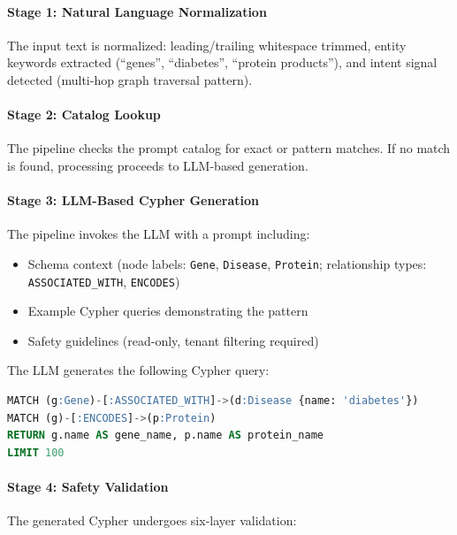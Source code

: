 \documentclass[a4paper,twoside]{sapthesis}
\begin{document}
\paragraph{Stage 1: Natural Language Normalization}
The input text is normalized: leading/trailing whitespace trimmed, entity keywords extracted (``genes'', ``diabetes'', ``protein products''), and intent signal detected (multi-hop graph traversal pattern).

\paragraph{Stage 2: Catalog Lookup}
The pipeline checks the prompt catalog for exact or pattern matches. If no match is found, processing proceeds to LLM-based generation.

\paragraph{Stage 3: LLM-Based Cypher Generation}
The pipeline invokes the LLM with a prompt including:
\begin{itemize}
    \item Schema context (node labels: \texttt{Gene}, \texttt{Disease}, \texttt{Protein}; relationship types: \texttt{ASSOCIATED\_WITH}, \texttt{ENCODES})
    \item Example Cypher queries demonstrating the pattern
    \item Safety guidelines (read-only, tenant filtering required)
\end{itemize}

The LLM generates the following Cypher query:
\begin{lstlisting}[language=SQL, caption={Generated Cypher query (before validation)}]
MATCH (g:Gene)-[:ASSOCIATED_WITH]->(d:Disease {name: 'diabetes'})
MATCH (g)-[:ENCODES]->(p:Protein)
RETURN g.name AS gene_name, p.name AS protein_name
LIMIT 100
\end{lstlisting}

\paragraph{Stage 4: Safety Validation}
The generated Cypher undergoes six-layer validation:
\end{document}
